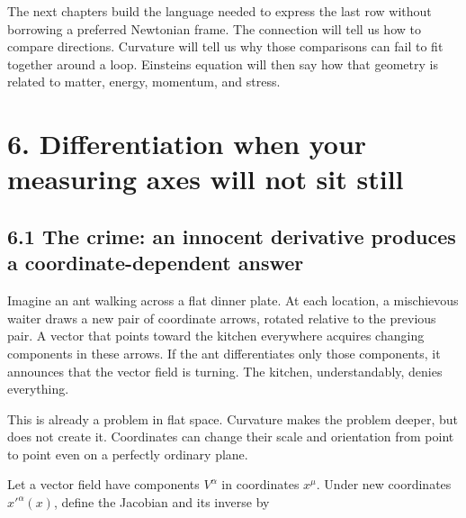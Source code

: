 \documentclass[
  11pt,
  letterpaper,
  oneside,
  openany]{scrbook}
\begin{document}
\endgroup

The next chapters build the language needed to express the last row
without borrowing a preferred Newtonian frame. The connection will tell
us how to compare directions. Curvature will tell us why those
comparisons can fail to fit together around a loop.
Einstein\textquotesingle s equation will then say how that geometry is
related to matter, energy, momentum, and stress.

\hypertarget{chapter-6}{%
\chapter{6. Differentiation when your measuring axes will not sit
still}\label{chapter-6}}

\hypertarget{the-crime-an-innocent-derivative-produces-a-coordinate-dependent-answer}{%
\section{6.1 The crime: an innocent derivative produces a
coordinate-dependent
answer}\label{the-crime-an-innocent-derivative-produces-a-coordinate-dependent-answer}}

Imagine an ant walking across a flat dinner plate. At each location, a
mischievous waiter draws a new pair of coordinate arrows, rotated
relative to the previous pair. A vector that points toward the kitchen
everywhere acquires changing components in these arrows. If the ant
differentiates only those components, it announces that the vector field
is turning. The kitchen, understandably, denies everything.

This is already a problem in flat space. Curvature makes the problem
deeper, but does not create it. Coordinates can change their scale and
orientation from point to point even on a perfectly ordinary plane.

Let a vector field have components \(V^\alpha\) in coordinates
\(x^\mu\). Under new coordinates \(x'^\alpha(x)\), define the Jacobian
and its inverse by

\begin{center}
\begingroup
{}
\ifdim\wd\grmathbox>\linewidth
\resizebox{\linewidth}{!}{\usebox{\grmathbox}}
\else\usebox{\grmathbox}\fi
\endgroup
\end{center}
\end{document}
